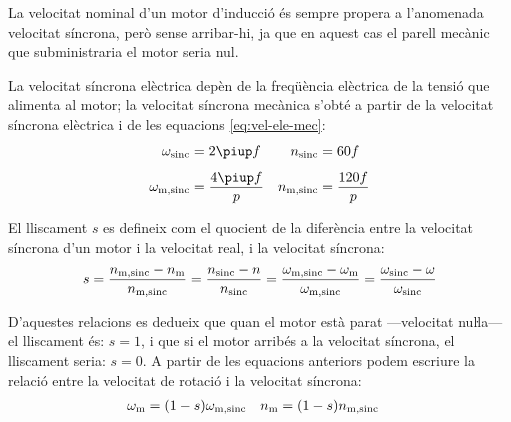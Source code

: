 La velocitat nominal d'un motor d'inducció és sempre propera a l'anomenada velocitat síncrona, però sense arribar-hi, ja que en aquest cas el parell mecànic que subministraria el motor seria nul.

La velocitat síncrona elèctrica depèn de la freqüència elèctrica de la tensió que alimenta al motor; la velocitat síncrona mecànica s'obté a partir de la velocitat síncrona elèctrica i de  les equacions \eqref{eq:vel-ele-mec}:
\begin{subequations}\index{motors d'inducció!velocitat síncrona}
\begin{align}
    \omega\ped{sinc} &= 2 \piup f & n\ped{sinc} &= 60 f \\[1ex]
    \omega\ped{m,sinc} &= \frac{4 \piup f}{p} & n\ped{m,sinc} &= \frac{120 f}{p}\label{eq:vel-mec-sinc}
\end{align}
\end{subequations}

El lliscament $s$ es defineix com el quocient de la diferència entre la velocitat síncrona d'un motor i la velocitat real, i la velocitat síncrona:
\begin{equation}\label{eq:lliscament}\index{lliscament}
    s = \frac{n\ped{m,sinc}-n\ped{m}}{n\ped{m,sinc}} =
    \frac{n\ped{sinc}-n}{n\ped{sinc}} =
    \frac{\omega\ped{m,sinc}-\omega\ped{m}}{\omega\ped{m,sinc}} =
    \frac{\omega\ped{sinc}-\omega}{\omega\ped{sinc}}
\end{equation}

D'aquestes relacions es dedueix que quan el motor està parat ---velocitat nuŀla--- el lliscament és: $s=1$, i que si el motor arribés a la velocitat síncrona, el lliscament seria: $s=0$. A partir de les equacions anteriors podem escriure la relació entre la velocitat de rotació i la velocitat síncrona:
\begin{align}
    \omega_\mathrm{m} &= (1-s) \omega_\mathrm{m,sinc} & n_\mathrm{m} &= (1-s) n_\mathrm{m,sinc} \label{eq:wm-wsinc}
\end{align}


